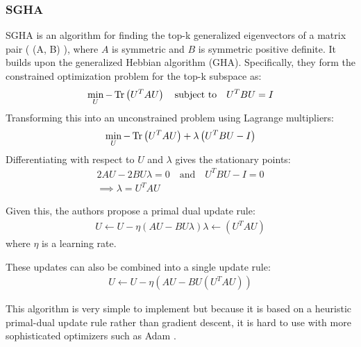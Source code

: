 \subsubsection{SGHA}
SGHA is an algorithm for finding the top-k generalized eigenvectors of a matrix pair ( (A, B) ), where \( A \) is symmetric and \( B \) is symmetric positive definite. It builds upon the generalized Hebbian algorithm (GHA).
Specifically, they form the constrained optimization problem for the top-k subspace as:
\begin{align}
\min_{U} -\operatorname{Tr} \left(U^T A U\right) \quad \text{subject to} \quad U^T B U = I
\end{align}
Transforming this into an unconstrained problem using Lagrange multipliers:
\begin{align}
\min_{U} -\operatorname{Tr}\left(U^T A U \right) + \lambda \left(U^T B U - I\right)
\end{align}
Differentiating with respect to \( U \) and \( \lambda \) gives the stationary points:
\begin{align}
2 A U - 2 B U \lambda = 0 \quad \text{and} \quad U^T B U - I = 0\\
\implies \lambda = U^T A U
\end{align}

Given this, the authors propose a primal dual update rule:
\begin{align}
U \leftarrow U - \eta \left( A U - B U \lambda \right)
\lambda \leftarrow \left( U^T A U \right)
\end{align}
where \( \eta \) is a learning rate.

These updates can also be combined into a single update rule:
\begin{align}
U \leftarrow U - \eta \left( A U - B U \left( U^T A U \right) \right)
\end{align}

This algorithm is very simple to implement but because it is based on a heuristic primal-dual update rule rather than gradient descent, it is hard to use with more sophisticated optimizers such as Adam \citep{kingma2014adam}.

